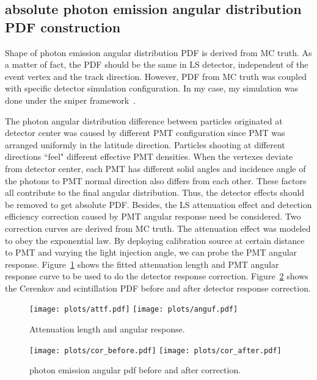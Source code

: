 \documentclass[a4paper,10pt]{cpc-hepnp}
\begin{document}
\subsection{absolute photon emission angular distribution PDF construction}
Shape of photon emission angular distribution PDF is derived from MC truth.
As a matter of fact, the PDF should be the same in LS detector, independent
of the event vertex and the track direction. However, PDF from MC truth was
coupled with specific detector simulation configuration. In my case, my
simulation was done under the sniper framework~\cite{sniper}.

The photon angular distribution difference between particles
originated at detector center was caused by different PMT configuration since
PMT was arranged uniformly in the latitude direction. Particles shooting at 
different directions ``feel" different effective PMT densities.
When the vertexes deviate from detector center, each PMT has different solid angles
and incidence angle of the photons to PMT normal direction also differs from 
each other. These factors all contribute to the final angular distribution.
Thus, the detector effects should be removed to get absolute PDF.
Besides, the LS attenuation effect and detection efficiency correction caused by PMT
angular response need be considered. Two correction curves are derived from MC truth.
The attenuation effect was modeled to obey the exponential law. By deploying 
calibration source at certain distance to
PMT and varying the light injection angle, we can probe the PMT angular
response. Figure~\ref{att_angu} shows the fitted attenuation length and PMT
angular response curve to be used to do the detector response correction.
Figure~\ref{xzcomp} shows the Cerenkov and scintillation PDF before and after
detector response correction.
\begin{figure}[htbp]
\centering %
\texttt{[image: plots/attf.pdf]}
\hfill
\texttt{[image: plots/anguf.pdf]}
\caption{\label{att_angu} Attenuation length and angular response.}
\end{figure}
\begin{figure}[htbp]
\centering %
\texttt{[image: plots/cor\_before.pdf]}%
\hfill
\texttt{[image: plots/cor\_after.pdf]}%
\caption{\label{xzcomp} photon emission angular pdf before and after
correction.}
\end{figure}
\end{document}
